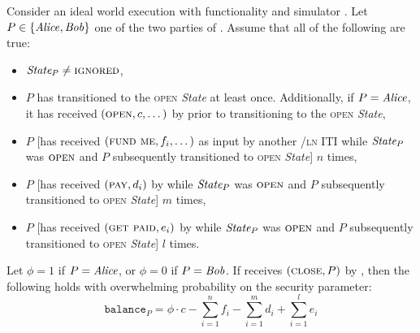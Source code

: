 \begin{lemma}
\label{lemma:ideal-balance}
  Consider an ideal world execution with functionality \fchan and simulator
  \simulator. Let $P \in \{\mathit{Alice}, \mathit{Bob}\}$ one of the two parties of \fchan.
  Assume that all of the following are true:
  \begin{itemize}
    \item $\itistate_P \neq \textsc{ignored}$,
    \item $P$ has transitioned to the \textsc{open} \textit{State} at least
    once. Additionally, if $P = \mathit{Alice}$, it has received $(\textsc{open}, c,
    \dots)$ by \environment prior to transitioning to the \textsc{open}
    \textit{State},
    \item $P$ [has received $(\textsc{fund me}, f_i, \dots)$ as input by another
    \fchan/\textsc{ln} ITI while $\itistate_P$ was $\textsc{open}$ and $P$
    subsequently transitioned to \textsc{open} \textit{State}] $n$ times,
    \item $P$ [has received $(\textsc{pay}, d_i)$ by \environment while
    $\itistate_P$ was $\textsc{open}$ and $P$ subsequently transitioned to
    \textsc{open} \textit{State}] $m$ times,
    \item $P$ [has received $(\textsc{get paid}, e_i)$ by \environment while
    $\itistate_P$ was $\textsc{open}$ and $P$ subsequently transitioned to
    \textsc{open} \textit{State}] $l$ times.
  \end{itemize}
  Let $\phi = 1$ if $P = \mathit{Alice}$, or $\phi = 0$ if $P = \mathit{Bob}$. If \fchan
  receives $(\textsc{close}, P)$ by \simulator, then the following holds with
  overwhelming probability on the security parameter:
  \begin{equation}
    \texttt{balance}_P = \phi \cdot c - \sum\limits_{i=1}^n f_i -
    \sum\limits_{i=1}^m d_i + \sum\limits_{i=1}^l e_i
  \end{equation}
\end{lemma}

